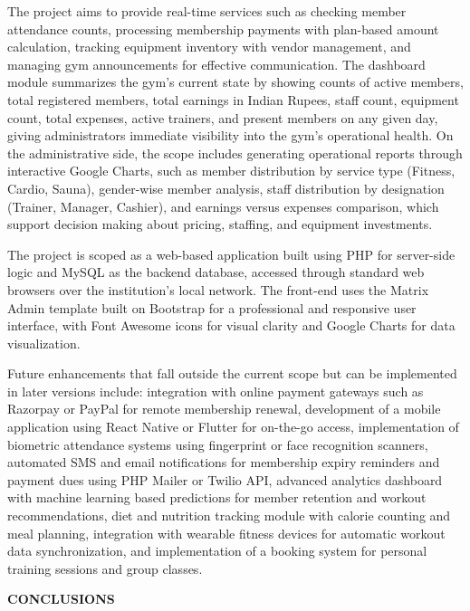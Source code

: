 \documentclass[12pt,a4paper]{report}
\begin{document}
The project aims to provide real-time services such as checking member attendance counts, processing membership payments with plan-based amount calculation, tracking equipment inventory with vendor management, and managing gym announcements for effective communication. The dashboard module summarizes the gym's current state by showing counts of active members, total registered members, total earnings in Indian Rupees, staff count, equipment count, total expenses, active trainers, and present members on any given day, giving administrators immediate visibility into the gym's operational health. On the administrative side, the scope includes generating operational reports through interactive Google Charts, such as member distribution by service type (Fitness, Cardio, Sauna), gender-wise member analysis, staff distribution by designation (Trainer, Manager, Cashier), and earnings versus expenses comparison, which support decision making about pricing, staffing, and equipment investments.

The project is scoped as a web-based application built using PHP for server-side logic and MySQL as the backend database, accessed through standard web browsers over the institution's local network. The front-end uses the Matrix Admin template built on Bootstrap for a professional and responsive user interface, with Font Awesome icons for visual clarity and Google Charts for data visualization.

Future enhancements that fall outside the current scope but can be implemented in later versions include: integration with online payment gateways such as Razorpay or PayPal for remote membership renewal, development of a mobile application using React Native or Flutter for on-the-go access, implementation of biometric attendance systems using fingerprint or face recognition scanners, automated SMS and email notifications for membership expiry reminders and payment dues using PHP Mailer or Twilio API, advanced analytics dashboard with machine learning based predictions for member retention and workout recommendations, diet and nutrition tracking module with calorie counting and meal planning, integration with wearable fitness devices for automatic workout data synchronization, and implementation of a booking system for personal training sessions and group classes.

\newpage
\vspace*{\fill}
\begin{center}
{\LARGE \textbf{CONCLUSIONS}}
\end{center}
\vspace*{\fill}
\end{document}
